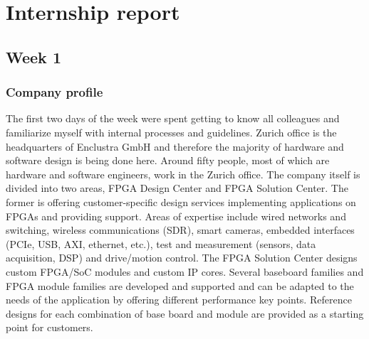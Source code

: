 \chapter{Internship report}
\section{Week 1}
\subsection{Company profile}
The first two days of the week were spent getting to know all colleagues and familiarize myself with internal processes and guidelines. Zurich office is the headquarters of Enclustra GmbH and therefore the majority of hardware and software design is being done here. Around fifty people, most of which are hardware and software engineers, work in the Zurich office. The company itself is divided into two areas, \ac{FPGA} Design Center and \ac{FPGA} Solution Center.
The former is offering customer-specific design services implementing applications on \acp{FPGA} and providing support. Areas of expertise include wired networks and switching, wireless communications (\ac{SDR}), smart cameras, embedded interfaces (\ac{PCIe}, \ac{USB}, \ac{AXI}, ethernet, etc.), test and measurement (sensors, data acquisition, \ac{DSP}) and drive/motion control. 
The FPGA Solution Center designs custom \ac{FPGA}/\ac{SoC} modules and custom \ac{IP} cores. Several baseboard families and \ac{FPGA} module families are developed and supported and can be adapted to the needs of the application by offering different performance key points. Reference designs for each combination of base board and module are provided as a starting point for customers.
